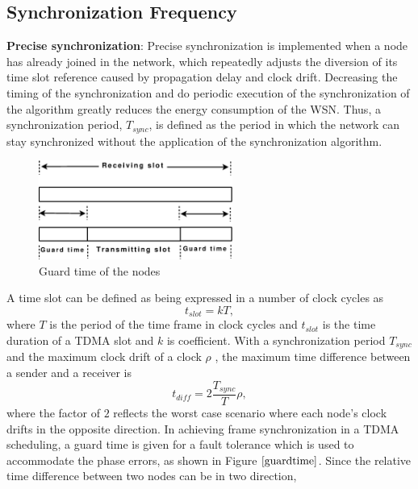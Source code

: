 \documentclass[journal]{IEEEtran}
\begin{document}
\subsection{\textbf{Synchronization Frequency}}
\noindent \textbf{Precise synchronization}: Precise synchronization is implemented when a node has already joined in the network, which repeatedly adjusts the diversion of its time slot reference caused by propagation delay and clock drift. \newline \noindent
\newline \noindent
Decreasing the timing of the synchronization and do periodic execution of the synchronization of the algorithm greatly reduces
the energy consumption of the WSN. Thus, a synchronization period, $T_{sync}$, is defined as the period in which the network can stay synchronized without the application of the synchronization algorithm.
\begin{figure}
\centering
\includegraphics[width=2.5in]{guardtime}
\caption{Guard time of the nodes} \label{guardtime}
\end{figure}
\newline A time slot can be defined as being expressed in a
number of clock cycles as
\begin{equation}
t_{slot} = kT ,
\end{equation} where $T$ is the period of the time frame in clock cycles and
$t_{slot}$ is the time duration of a TDMA slot and $k$ is coefficient.
\newline With a synchronization period $T_{sync}$ and the
maximum clock drift of a clock $\rho$ , the maximum time difference
between a sender and a receiver is
\begin{equation}
t_{diff} = 2\frac{T_{sync}}{T}\rho ,
\end{equation}
where the factor of $2$ reflects the worst case scenario where each
node's clock drifts in the opposite direction.\newline
In achieving frame synchronization in a TDMA scheduling, a guard time is given for a fault tolerance which is used to accommodate the
phase errors, as shown in Figure $\ref{guardtime}$.  Since the
relative time difference between two nodes can be in two direction,
\end{document}

